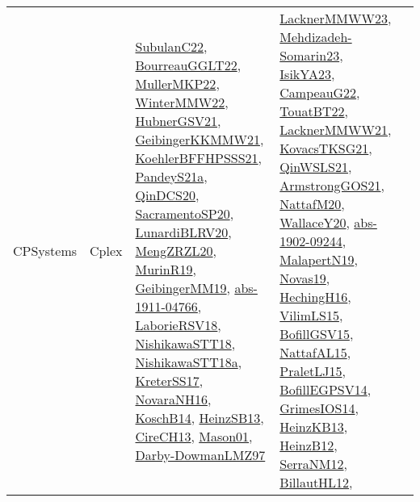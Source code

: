 {\begin{longtable}{lp{3cm}>{\raggedright}p{6cm}>{\raggedright}p{6cm}p{8cm}}
CPSystems & Cplex & \href{articles/SubulanC22.pdf}{SubulanC22}\cite{SubulanC22}, \href{articles/BourreauGGLT22.pdf}{BourreauGGLT22}\cite{BourreauGGLT22}, \href{articles/MullerMKP22.pdf}{MullerMKP22}\cite{MullerMKP22}, \href{papers/WinterMMW22.pdf}{WinterMMW22}\cite{WinterMMW22}, \href{articles/HubnerGSV21.pdf}{HubnerGSV21}\cite{HubnerGSV21}, \href{papers/GeibingerKKMMW21.pdf}{GeibingerKKMMW21}\cite{GeibingerKKMMW21}, \href{articles/KoehlerBFFHPSSS21.pdf}{KoehlerBFFHPSSS21}\cite{KoehlerBFFHPSSS21}, \href{articles/PandeyS21a.pdf}{PandeyS21a}\cite{PandeyS21a}, \href{articles/QinDCS20.pdf}{QinDCS20}\cite{QinDCS20}, \href{articles/SacramentoSP20.pdf}{SacramentoSP20}\cite{SacramentoSP20}, \href{articles/LunardiBLRV20.pdf}{LunardiBLRV20}\cite{LunardiBLRV20}, \href{articles/MengZRZL20.pdf}{MengZRZL20}\cite{MengZRZL20}, \href{papers/MurinR19.pdf}{MurinR19}\cite{MurinR19}, \href{papers/GeibingerMM19.pdf}{GeibingerMM19}\cite{GeibingerMM19}, \href{articles/abs-1911-04766.pdf}{abs-1911-04766}\cite{abs-1911-04766}, \href{articles/LaborieRSV18.pdf}{LaborieRSV18}\cite{LaborieRSV18}, \href{papers/NishikawaSTT18.pdf}{NishikawaSTT18}\cite{NishikawaSTT18}, \href{papers/NishikawaSTT18a.pdf}{NishikawaSTT18a}\cite{NishikawaSTT18a}, \href{articles/KreterSS17.pdf}{KreterSS17}\cite{KreterSS17}, \href{articles/NovaraNH16.pdf}{NovaraNH16}\cite{NovaraNH16}, \href{papers/KoschB14.pdf}{KoschB14}\cite{KoschB14}, \href{articles/HeinzSB13.pdf}{HeinzSB13}\cite{HeinzSB13}, \href{papers/CireCH13.pdf}{CireCH13}\cite{CireCH13}, \href{articles/Mason01.pdf}{Mason01}\cite{Mason01}, \href{articles/Darby-DowmanLMZ97.pdf}{Darby-DowmanLMZ97}\cite{Darby-DowmanLMZ97} & \href{articles/LacknerMMWW23.pdf}{LacknerMMWW23}\cite{LacknerMMWW23}, \href{papers/Mehdizadeh-Somarin23.pdf}{Mehdizadeh-Somarin23}\cite{Mehdizadeh-Somarin23}, \href{articles/IsikYA23.pdf}{IsikYA23}\cite{IsikYA23}, \href{articles/CampeauG22.pdf}{CampeauG22}\cite{CampeauG22}, \href{papers/TouatBT22.pdf}{TouatBT22}\cite{TouatBT22}, \href{papers/LacknerMMWW21.pdf}{LacknerMMWW21}\cite{LacknerMMWW21}, \href{papers/KovacsTKSG21.pdf}{KovacsTKSG21}\cite{KovacsTKSG21}, \href{articles/QinWSLS21.pdf}{QinWSLS21}\cite{QinWSLS21}, \href{papers/ArmstrongGOS21.pdf}{ArmstrongGOS21}\cite{ArmstrongGOS21}, \href{papers/NattafM20.pdf}{NattafM20}\cite{NattafM20}, \href{articles/WallaceY20.pdf}{WallaceY20}\cite{WallaceY20}, \href{articles/abs-1902-09244.pdf}{abs-1902-09244}\cite{abs-1902-09244}, \href{papers/MalapertN19.pdf}{MalapertN19}\cite{MalapertN19}, \href{articles/Novas19.pdf}{Novas19}\cite{Novas19}, \href{papers/HechingH16.pdf}{HechingH16}\cite{HechingH16}, \href{papers/VilimLS15.pdf}{VilimLS15}\cite{VilimLS15}, \href{papers/BofillGSV15.pdf}{BofillGSV15}\cite{BofillGSV15}, \href{articles/NattafAL15.pdf}{NattafAL15}\cite{NattafAL15}, \href{papers/PraletLJ15.pdf}{PraletLJ15}\cite{PraletLJ15}, \href{papers/BofillEGPSV14.pdf}{BofillEGPSV14}\cite{BofillEGPSV14}, \href{articles/GrimesIOS14.pdf}{GrimesIOS14}\cite{GrimesIOS14}, \href{papers/HeinzKB13.pdf}{HeinzKB13}\cite{HeinzKB13}, \href{papers/HeinzB12.pdf}{HeinzB12}\cite{HeinzB12}, \href{papers/SerraNM12.pdf}{SerraNM12}\cite{SerraNM12}, \href{papers/BillautHL12.pdf}{BillautHL12}\cite{BillautHL12}, 
\end{longtable}}
